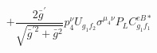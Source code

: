 %
\begin{dmath*}
%
  +  \frac{2 {\bar g}^\prime}{\sqrt{{\bar g}^{\prime 2} + {\bar g}{}^2}}p_4^{\nu} U_{g_1 f_2} \sigma^{\mu_4 \nu } P_L  C^{eB*}_{g_1 f_1}
%
\end{dmath*}
%

